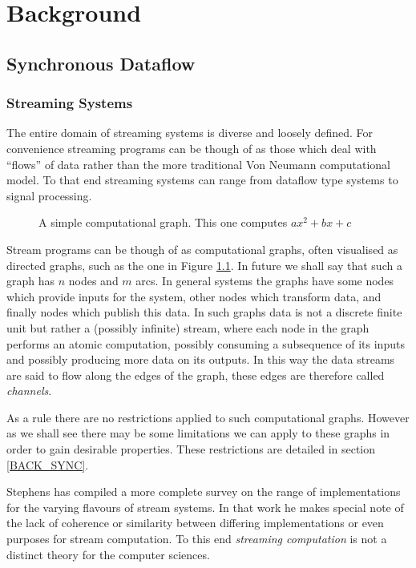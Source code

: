 \chapter{Background}
\section{Synchronous Dataflow}

\subsection{Streaming Systems}
The entire domain of streaming systems is diverse and loosely defined.
For convenience streaming programs can be though of as those which deal with ``flows'' of data rather than the more traditional Von Neumann computational model.
To that end streaming systems can range from dataflow type systems to signal processing.

\begin{figure}
\begin{center}
	
\caption{A simple computational graph.  This one computes $ax^2 + bx + c$}
\label{figSimpleDG}
\end{center}
\end{figure}

Stream programs can be though of as computational graphs, often visualised as directed graphs, such as the one in Figure \ref{figSimpleDG}.
In future we shall say that such a graph has $n$ nodes and $m$ arcs.
In general systems the graphs have some nodes which provide inputs for the system, other nodes which transform data, and finally nodes which publish this data.
In such graphs data is not a discrete finite unit but rather a (possibly infinite) stream, where each node in the graph performs an atomic computation, possibly consuming a subsequence of its inputs and possibly producing more data on its outputs.
In this way the data streams are said to flow along the edges of the graph, these edges are therefore called {\em channels}.

As a rule there are no restrictions applied to such computational graphs.
However as we shall see there may be some limitations we can apply to these graphs in order to gain desirable properties.
These restrictions are detailed in section \ref{BACK_SYNC}.

Stephens has compiled a more complete survey \cite{ste97} on the range of implementations for the varying flavours of stream systems.
In that work he makes special note of the lack of coherence or similarity between differing implementations or even purposes for stream computation.
To this end {\em streaming computation} is not a distinct theory for the computer sciences.

